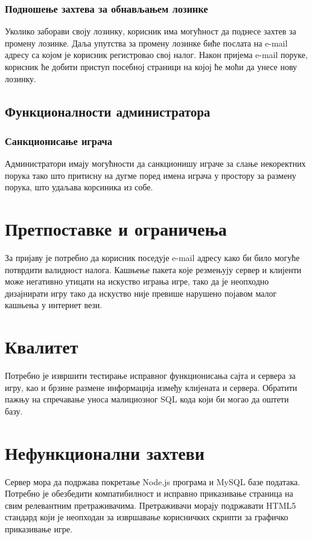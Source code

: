 \subsubsection{Подношење захтева за обнављањем лозинке}
Уколико заборави своју лозинку, корисник има могућност да поднесе захтев за промену лозинке. 
Даља упутства за промену лозинке биће послата на e-mail адресу
са којом је корисник регистровао свој налог.
Након пријема e-mail поруке, корисник ће добити приступ посебној
страници на којој ће моћи да унесе нову лозинку.

\subsection{Функционалности администратора}

\subsubsection{Санкционисање играча}
Администратори имају могућности да санкционишу играче за слање некоректних порука тако што притисну на дугме поред
имена играча у простору за размену порука, што удаљава корсиника из собе.



\section{Претпоставке и ограничења}
За пријаву је потребно да корисник поседује e-mail адресу како би било могуће потврдити валидност налога.
Кашњење пакета које резмењују сервер и клијенти може негативно утицати на искуство играња игре, тако да је
неопходно дизајнирати игру тако да искуство није превише нарушено појавом малог кашњења у интернет вези.



\section{Квалитет}
Потребно је извршити тестирање исправног функционисања сајта и сервера за игру, као и брзине размене информација
између клијената и сервера. Обратити пажњу на спречавање уноса малициозног SQL кода који би могао да оштети базу.



\section{Нефункционални захтеви}
Сервер мора да подржава покретање Node.js програма и MySQL базе података. Потребно је обезбедити компатибилност 
и исправно приказивање страница на свим релевантним претраживачима. Претраживачи морају подржавати HTML5 стандард
који је неопходан за извршавање корисничких скрипти за графичко приказивање игре.



